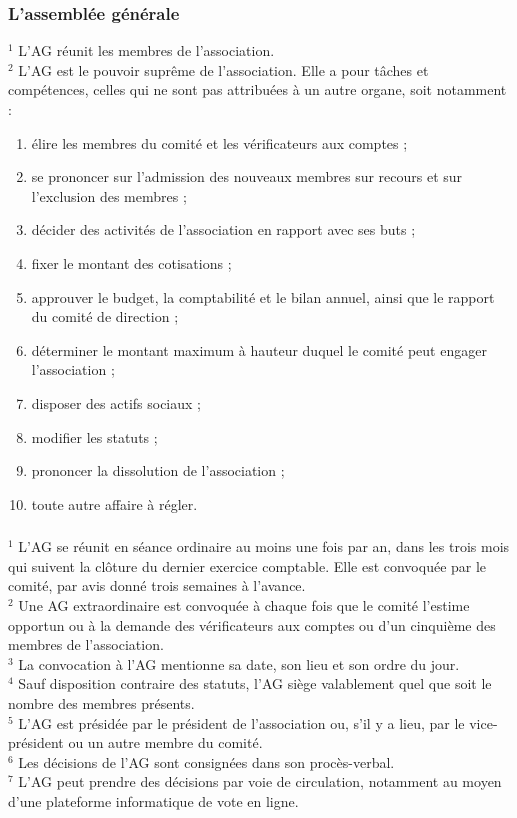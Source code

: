 \documentclass[12pt,a4paper,oneside]{article}
\newcounter{art}
\newcommand{\french}{    \switchcolumn[1]\noindent}
\newcounter{para}
\begin{document}
\begin{paracol}{2}
\french
	\subsubsection{L’assemblée générale}
	$^1$ L’AG réunit les membres de l’association. \\
	$^2$ L’AG est le pouvoir suprême de l’association. Elle a pour tâches et compétences, celles qui ne sont pas attribuées à un autre organe, soit notamment :
	
	\begin{enumerate}[-]
	\item élire les membres du comité et les vérificateurs aux comptes ;
	\item se prononcer sur l’admission des nouveaux membres sur recours et sur l’exclusion des
    membres ; 
	\item décider des activités de l’association en rapport avec ses buts ;
	\item fixer le montant des cotisations ;
	\item approuver le budget, la comptabilité et le bilan annuel, ainsi que le rapport du comité
    de direction ;
	\item déterminer le montant maximum à hauteur duquel le comité peut engager
    l’association ;
	\item disposer des actifs sociaux ;
 	\item modifier les statuts ;
 	\item prononcer la dissolution de l’association ;
 	\item toute autre affaire à régler.
	\end{enumerate}

\french
	\subsubsection{}

	$^1$ L’AG se réunit en séance ordinaire au moins une fois par an, dans les trois mois qui suivent la clôture du dernier exercice comptable. Elle est convoquée par le comité, par avis donné trois semaines à l’avance. \\
	$^2$ Une AG extraordinaire est convoquée à chaque fois que le comité l’estime opportun ou à la demande des vérificateurs aux comptes ou d’un cinquième des membres de l’association. \\
	$^3$ La convocation à l’AG mentionne sa date, son lieu et son ordre du jour. \\
	$^4$ Sauf disposition contraire des statuts, l’AG siège valablement quel que soit le nombre des membres présents. \\
	$^5$ L’AG est présidée par le président de l’association ou, s’il y a lieu, par le vice-président ou un autre membre du comité. \\
	$^6$ Les décisions de l’AG sont consignées dans son procès-verbal. \\
	$^7$ L’AG peut prendre des décisions par voie de circulation, notamment au moyen d’une plateforme informatique de vote en ligne.


\end{paracol}
\end{document}
